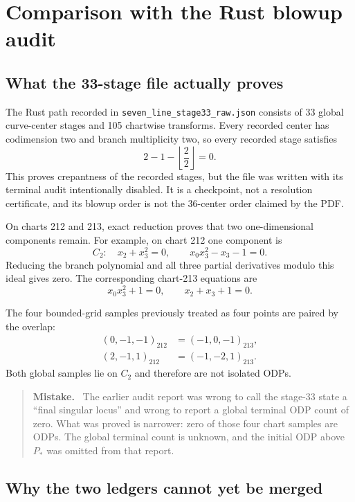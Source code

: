 \documentclass[11pt]{article}
\newenvironment{mistake}
  {\begin{quote}\color{mistakered}\textbf{Mistake.}\ }
  {\end{quote}}
\begin{document}
\section{Comparison with the Rust blowup audit}

\subsection{What the 33-stage file actually proves}

The Rust path recorded in \texttt{seven\_line\_stage33\_raw.json} consists of 33 global
curve-center stages and 105 chartwise transforms.  Every recorded center has codimension
two and branch multiplicity two, so every recorded stage satisfies
\[
  2-1-\left\lfloor\frac{2}{2}\right\rfloor=0.
\]
This proves crepantness of the recorded stages, but the file was written with its terminal
audit intentionally disabled.  It is a checkpoint, not a resolution certificate, and its
blowup order is not the 36-center order claimed by the PDF.

On charts 212 and 213, exact reduction proves that two one-dimensional components remain.
For example, on chart 212 one component is
\[
  C_2:\quad x_2+x_3^2=0,\qquad x_0x_3^2-x_3-1=0.
\]
Reducing the branch polynomial and all three partial derivatives modulo this ideal gives
zero.  The corresponding chart-213 equations are
\[
  x_0x_3^2+1=0,\qquad x_2+x_3+1=0.
\]

The four bounded-grid samples previously treated as four points are paired by the overlap:
\begin{align*}
(0,-1,-1)_{212}&=(-1,0,-1)_{213},\\
(2,-1,1)_{212}&=(-1,-2,1)_{213}.
\end{align*}
Both global samples lie on $C_2$ and therefore are not isolated ODPs.

\begin{mistake}
The earlier audit report was wrong to call the stage-33 state a ``final singular locus'' and
wrong to report a global terminal ODP count of zero.  What was proved is narrower: zero of
those four chart samples are ODPs.  The global terminal count is unknown, and the initial
ODP above $P_*$ was omitted from that report.
\end{mistake}

\subsection{Why the two ledgers cannot yet be merged}
\end{document}
